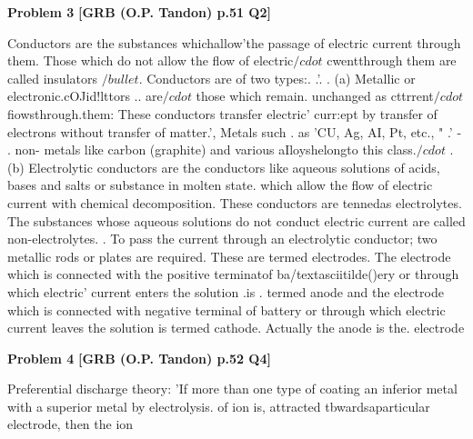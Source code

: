 \begin{problembox}
\textbf{Problem 3} \hfill \textbf{[GRB (O.P. Tandon) p.51 Q2]}
\label{q:ext-grb_all_questions-3}

Conductors are the substances whichallow'the passage 
of electric current through them. Those which do not allow the 
flow of electric$/cdot$ cwentthrough them are called insulators $/bullet$. 
Conductors are of two types:. 
.'. 
. 
(a) Metallic or electronic.cOJid!lttors .. are$/cdot$ those which 
remain. unchanged as cttrrent$/cdot$ fiowsthrough.them: These 
conductors transfer electric' curr:ept by transfer of electrons 
without transfer of matter.', Metals such . as 'CU, Ag, AI, Pt, etc., 
" 
.' 
-
. 
non- metals like carbon (graphite) and various aIloyshelongto 
this class.$/cdot$ 
. 
(b) Electrolytic conductors are the conductors like aqueous 
solutions of acids, bases and salts or substance in molten state. 
which allow the flow of electric current with chemical 
decomposition. These conductors are tennedas electrolytes. The 
substances whose aqueous solutions do not conduct electric 
current are called non-electrolytes. 
. 
To pass the current through an electrolytic conductor; two 
metallic rods or plates are required. These are termed electrodes. 
The electrode which is connected with the positive terminatof 
ba/textasciitilde()ery or through which electric' current enters the solution .is 
. termed anode and the electrode which is connected with negative 
terminal of battery or through which electric current leaves the 
solution is termed cathode. Actually the anode is the. electrode
\end{problembox}

\begin{problembox}
\textbf{Problem 4} \hfill \textbf{[GRB (O.P. Tandon) p.52 Q4]}
\label{q:ext-grb_all_questions-4}

Preferential discharge theory: 'If more than one type 
of coating an inferior metal with a superior metal by electrolysis. 
of ion is, attracted tbwardsaparticular electrode, then the ion
\end{problembox}

